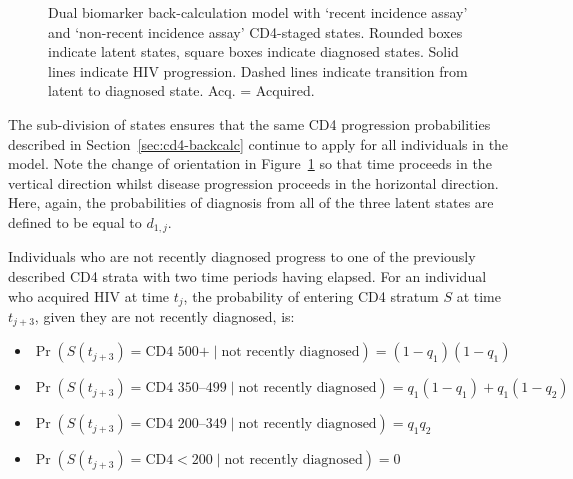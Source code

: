\begin{figure}[htbp!]
  \caption[Dual biomarker back-calculation model with `recent incidence assay' and `non-recent incidence assay' CD4-staged states]{Dual biomarker back-calculation model with `recent incidence assay' and `non-recent incidence assay' CD4-staged states. Rounded boxes indicate latent states, square boxes indicate diagnosed states. Solid lines indicate HIV progression. Dashed lines indicate transition from latent to diagnosed state. Acq. = Acquired.}\label{fig:ritamodel}
\end{figure}

The sub-division of states ensures that the same CD4 progression probabilities described in Section~\ref{sec:cd4-backcalc} continue to apply for all individuals in the model. Note the change of orientation in Figure~\ref{fig:ritamodel} so that time proceeds in the vertical direction whilst disease progression proceeds in the horizontal direction. Here, again, the probabilities of diagnosis from all of the three latent states are defined to be equal to $d_{1,j}$.

Individuals who are not recently diagnosed progress to one of the previously described CD4 strata with two time periods having elapsed. For an individual who acquired HIV at time $t_j$, the probability of entering CD4 stratum $S$ at time $t_{j+3}$, given they are not recently diagnosed, is:
%
\begin{itemize}
  \item $\Pr(S(t_{j+3}) = \text{CD4 500+} \mid \text{not recently diagnosed}) = (1-q_1)(1-q_1)$
  \item $\Pr(S(t_{j+3}) = \text{CD4 350--499} \mid \text{not recently diagnosed}) = q_1(1-q_1) + q_1(1-q_2)$
  \item $\Pr(S(t_{j+3}) = \text{CD4 200--349} \mid \text{not recently diagnosed}) = q_1 q_2$
  \item $\Pr(S(t_{j+3}) = \text{CD4}<200 \mid \text{not recently diagnosed}) = 0$
\end{itemize}


